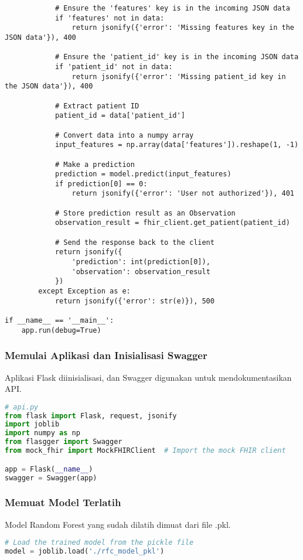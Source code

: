 \begin{lstlisting}
            # Ensure the 'features' key is in the incoming JSON data
            if 'features' not in data:
                return jsonify({'error': 'Missing features key in the JSON data'}), 400

            # Ensure the 'patient_id' key is in the incoming JSON data
            if 'patient_id' not in data:
                return jsonify({'error': 'Missing patient_id key in the JSON data'}), 400

            # Extract patient ID
            patient_id = data['patient_id']

            # Convert data into a numpy array
            input_features = np.array(data['features']).reshape(1, -1)
            
            # Make a prediction
            prediction = model.predict(input_features)
            if prediction[0] == 0:
                return jsonify({'error': 'User not authorized'}), 401

            # Store prediction result as an Observation
            observation_result = fhir_client.get_patient(patient_id)

            # Send the response back to the client
            return jsonify({
                'prediction': int(prediction[0]),
                'observation': observation_result
            })
        except Exception as e:
            return jsonify({'error': str(e)}), 500

if __name__ == '__main__':
    app.run(debug=True)
\end{lstlisting}


\subsubsection{Memulai Aplikasi dan Inisialisasi Swagger}
Aplikasi Flask diinisialisasi, dan Swagger digunakan untuk mendokumentasikan API.
\begin{lstlisting}[language=Python, caption=Inisialisasi Flask dan Swagger]
# api.py
from flask import Flask, request, jsonify
import joblib
import numpy as np
from flasgger import Swagger
from mock_fhir import MockFHIRClient  # Import the mock FHIR client

app = Flask(__name__)
swagger = Swagger(app)
\end{lstlisting}

\subsubsection{Memuat Model Terlatih}
Model Random Forest yang sudah dilatih dimuat dari file .pkl.
\begin{lstlisting}[language=Python, caption=Memuat Model]
# Load the trained model from the pickle file
model = joblib.load('./rfc_model_pkl')
\end{lstlisting}

